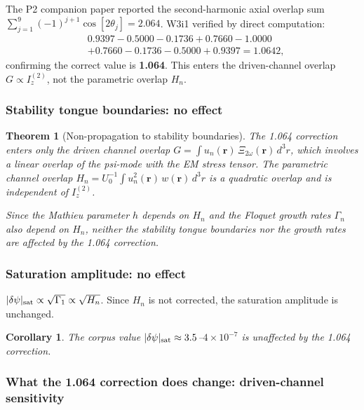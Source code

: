 \documentclass[11pt,twocolumn]{article}
\newcommand{\dpsi}{\delta\psi}
\newcommand{\br}{\mathbf{r}}
\newtheorem{theorem}{Theorem}
\newtheorem{corollary}{Corollary}
\begin{document}
The P2 companion paper reported the second-harmonic axial overlap
sum $\sum_{j=1}^9 (-1)^{j+1}\cos[2\theta_j] = 2.064$. W3i1 verified
by direct computation:
\begin{align}
&0.9397 - 0.5000 - 0.1736 + 0.7660 - 1.0000 \nonumber\\
&+ 0.7660 - 0.1736 - 0.5000 + 0.9397 = 1.0642,
\end{align}
confirming the correct value is \textbf{1.064}. This enters the
driven-channel overlap $G \propto I_z^{(2)}$, not the parametric
overlap $H_n$.

\subsubsection{Stability tongue boundaries: no effect}

\begin{theorem}[Non-propagation to stability boundaries]
\label{thm:nonpropagation}
The 1.064 correction enters only the \emph{driven channel} overlap
$G = \int u_n(\br)\,\Xi_{2\omega}(\br)\,d^3r$, which involves a
linear overlap of the psi-mode with the EM stress tensor. The
parametric channel overlap $H_n = U_0^{-1}\int u_n^2(\br)\,w(\br)\,d^3r$
is a \emph{quadratic} overlap and is independent of $I_z^{(2)}$.

Since the Mathieu parameter $h$ depends on $H_n$ and the Floquet
growth rates $\Gamma_n$ also depend on $H_n$, \emph{neither the
stability tongue boundaries nor the growth rates are affected by
the 1.064 correction.}
\end{theorem}

\subsubsection{Saturation amplitude: no effect}

$|\dpsi|_{\rm sat} \propto \sqrt{\Gamma_1} \propto \sqrt{H_n}$.
Since $H_n$ is not corrected, the saturation amplitude is unchanged.

\begin{corollary}
The corpus value $|\dpsi|_{\rm sat} \approx 3.5$--$4\times10^{-7}$
is unaffected by the 1.064 correction.
\end{corollary}

\subsubsection{What the 1.064 correction does change: driven-channel sensitivity}
\end{document}
